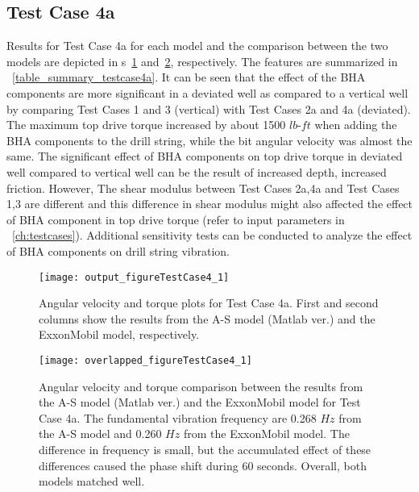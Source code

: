 \subsection{Test Case 4a}
Results for Test Case 4a for each model and the comparison between the two models are depicted in \figurename{}s~\ref{figure_testcase4_1} and~\ref{figure_testCase4_1_overlapped}, respectively. The features are summarized in \tablename~\ref{table_summary_testcase4a}. It can be seen that the effect of the BHA components are more significant in a deviated well as compared to a vertical well by comparing Test Cases 1 and 3 (vertical) with Test Cases 2a and 4a (deviated). The maximum top drive torque increased by about 1500 $lb\mbox{-}ft$ when adding the BHA components to the drill string, while the bit angular velocity was almost the same. The significant effect of \resolvedcomment{} BHA components on top drive torque in deviated well  compared to vertical well can be the result of increased depth, increased friction. However, The shear modulus between Test Cases 2a,4a and Test Cases 1,3 are different and this difference in shear modulus might also affected the effect of BHA component in top drive torque \resolvedcomment{} (refer to input parameters in \chaptername~\ref{ch:testcases}). Additional sensitivity tests can be conducted to analyze the effect of BHA components on drill string vibration.

\begin{figure}
  \centering
  \texttt{[image: output\_figureTestCase4\_1]}
  \caption[Angular velocity and torque plots for Test Case 4a]{Angular velocity and torque plots for Test Case 4a. First and second columns show the results from the A-S model (Matlab ver.) and the ExxonMobil model, respectively.}\label{figure_testcase4_1}
\end{figure}

\begin{figure}
  \centering
  \texttt{[image: overlapped\_figureTestCase4\_1]}
  \caption[Angular velocity and torque comparison plots for Test Case 4a]{Angular velocity and torque comparison between the results from the A-S model (Matlab ver.) and the ExxonMobil model for Test Case 4a. The fundamental vibration frequency are 0.268 $Hz$ from the A-S model and 0.260 $Hz$ from the ExxonMobil model. The difference in frequency is small, but the accumulated effect of these differences caused the phase shift during 60 seconds. Overall, both models matched well.}\label{figure_testCase4_1_overlapped}
\end{figure}

